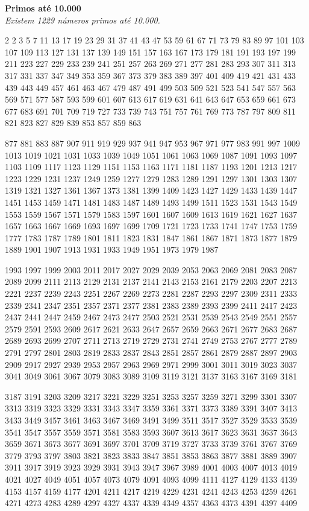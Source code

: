 \documentclass{article}
\begin{document}
\noindent
\textbf{Primos até 10.000} \\
\textit{Existem 1229 números primos até 10.000.}

\begin{multicols}{2}
2
3
5
7
11
13
17
19
23
29
31
37
41
43
47
53
59
61
67
71
73
79
83
89
97
101
103
107
109
113
127
131
137
139
149
151
157
163
167
173
179
181
191
193
197
199
211
223
227
229
233
239
241
251
257
263
269
271
277
281
283
293
307
311
313
317
331
337
347
349
353
359
367
373
379
383
389
397
401
409
419
421
431
433
439
443
449
457
461
463
467
479
487
491
499
503
509
521
523
541
547
557
563
569
571
577
587
593
599
601
607
613
617
619
631
641
643
647
653
659
661
673
677
683
691
701
709
719
727
733
739
743
751
757
761
769
773
787
797
809
811
821
823
827
829
839
853
857
859
863

\vfill

877
881
883
887
907
911
919
929
937
941
947
953
967
971
977
983
991
997
1009
1013
1019
1021
1031
1033
1039
1049
1051
1061
1063
1069
1087
1091
1093
1097
1103
1109
1117
1123
1129
1151
1153
1163
1171
1181
1187
1193
1201
1213
1217
1223
1229
1231
1237
1249
1259
1277
1279
1283
1289
1291
1297
1301
1303
1307
1319
1321
1327
1361
1367
1373
1381
1399
1409
1423
1427
1429
1433
1439
1447
1451
1453
1459
1471
1481
1483
1487
1489
1493
1499
1511
1523
1531
1543
1549
1553
1559
1567
1571
1579
1583
1597
1601
1607
1609
1613
1619
1621
1627
1637
1657
1663
1667
1669
1693
1697
1699
1709
1721
1723
1733
1741
1747
1753
1759
1777
1783
1787
1789
1801
1811
1823
1831
1847
1861
1867
1871
1873
1877
1879
1889
1901
1907
1913
1931
1933
1949
1951
1973
1979
1987

\vfill

1993
1997
1999
2003
2011
2017
2027
2029
2039
2053
2063
2069
2081
2083
2087
2089
2099
2111
2113
2129
2131
2137
2141
2143
2153
2161
2179
2203
2207
2213
2221
2237
2239
2243
2251
2267
2269
2273
2281
2287
2293
2297
2309
2311
2333
2339
2341
2347
2351
2357
2371
2377
2381
2383
2389
2393
2399
2411
2417
2423
2437
2441
2447
2459
2467
2473
2477
2503
2521
2531
2539
2543
2549
2551
2557
2579
2591
2593
2609
2617
2621
2633
2647
2657
2659
2663
2671
2677
2683
2687
2689
2693
2699
2707
2711
2713
2719
2729
2731
2741
2749
2753
2767
2777
2789
2791
2797
2801
2803
2819
2833
2837
2843
2851
2857
2861
2879
2887
2897
2903
2909
2917
2927
2939
2953
2957
2963
2969
2971
2999
3001
3011
3019
3023
3037
3041
3049
3061
3067
3079
3083
3089
3109
3119
3121
3137
3163
3167
3169
3181

\vfill

3187
3191
3203
3209
3217
3221
3229
3251
3253
3257
3259
3271
3299
3301
3307
3313
3319
3323
3329
3331
3343
3347
3359
3361
3371
3373
3389
3391
3407
3413
3433
3449
3457
3461
3463
3467
3469
3491
3499
3511
3517
3527
3529
3533
3539
3541
3547
3557
3559
3571
3581
3583
3593
3607
3613
3617
3623
3631
3637
3643
3659
3671
3673
3677
3691
3697
3701
3709
3719
3727
3733
3739
3761
3767
3769
3779
3793
3797
3803
3821
3823
3833
3847
3851
3853
3863
3877
3881
3889
3907
3911
3917
3919
3923
3929
3931
3943
3947
3967
3989
4001
4003
4007
4013
4019
4021
4027
4049
4051
4057
4073
4079
4091
4093
4099
4111
4127
4129
4133
4139
4153
4157
4159
4177
4201
4211
4217
4219
4229
4231
4241
4243
4253
4259
4261
4271
4273
4283
4289
4297
4327
4337
4339
4349
4357
4363
4373
4391
4397
4409


\end{multicols}
\end{document}
